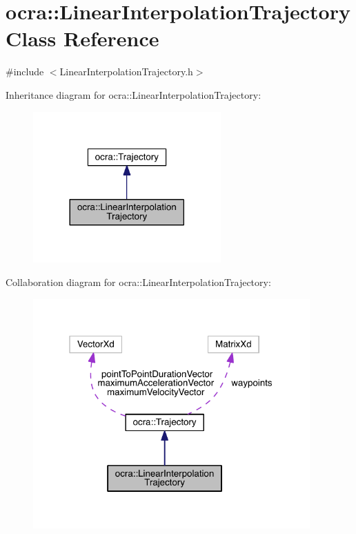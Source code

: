 \hypertarget{classocra_1_1LinearInterpolationTrajectory}{}\section{ocra\+:\+:Linear\+Interpolation\+Trajectory Class Reference}
\label{classocra_1_1LinearInterpolationTrajectory}


{\ttfamily \#include $<$Linear\+Interpolation\+Trajectory.\+h$>$}



Inheritance diagram for ocra\+:\+:Linear\+Interpolation\+Trajectory\+:\nopagebreak
\begin{figure}[H]
\begin{center}
\leavevmode
\includegraphics[width=204pt]{d2/d7a/classocra_1_1LinearInterpolationTrajectory__inherit__graph}
\end{center}
\end{figure}


Collaboration diagram for ocra\+:\+:Linear\+Interpolation\+Trajectory\+:\nopagebreak
\begin{figure}[H]
\begin{center}
\leavevmode
\includegraphics[width=301pt]{df/d3f/classocra_1_1LinearInterpolationTrajectory__coll__graph}
\end{center}
\end{figure}
